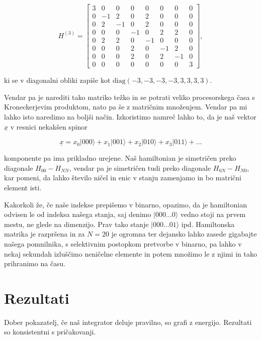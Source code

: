 \documentclass[a4 paper, 12pt]{article}
\begin{document}
\begin{equation}
	H^{(3)} = \begin{bmatrix}
	3 & 0 & 0 & 0 & 0 & 0 & 0 & 0 \\
	0 & -1 & 2 & 0 & 2 & 0 & 0 & 0 \\
	0 & 2 & -1 & 0 & 2 & 0 & 0 & 0 \\
	0 & 0 & 0 & -1 & 0 & 2 & 2 & 0 \\
	0 & 2 & 2 & 0 & -1 & 0 & 0 & 0 \\
	0 & 0 & 0 & 2 & 0 & -1 & 2 & 0 \\
	0 & 0 & 0 & 2 & 0 & 2 & -1 & 0 \\
	0 & 0 & 0 & 0 & 0 & 0 & 0 & 3
	\end{bmatrix},
\end{equation}

ki se v diagonalni obliki zapiše kot $\text{diag}(-3, -3, -3, -3, 3, 3, 3, 3)$.

Vendar pa je narediti tako matriko težko in se potrati veliko procesorskega časa s Kroneckerjevim produktom,
nato pa še z matričnim množenjem. Vendar pa mi lahko isto naredimo na boljši način. Izkoristimo namreč lahko
to, da je naš vektor $\underline{x}$ v resnici nekakšen spinor

\[
	\underline{x} = x_0|000\rangle + x_1|001\rangle + x_2|010\rangle + x_3|011\rangle + \ldots
\]

komponente pa ima prikladno urejene. Naš hamiltonian je simetričen preko diagonale $H_{00} - H_{NN}$,
vendar pa je simetričen tudi preko diagonale $H_{0N} - H_{N0}$, kar pomeni, da lahko število ničel in
enic v stanju zamenjamo in bo matrični element isti.

Kakorkoli že, če naše indekse prepišemo v binarno, opazimo, da je hamiltonian odvisen le od indeksa našega
stanja, saj denimo $|000\ldots0\rangle$ vedno stoji na prvem mestu, ne glede na dimenzijo. Prav tako
stanje $|000\ldots01\rangle$ ipd. Hamiltonska matrika je razpršena in za $N = 20$ je ogromna ter dejansko
lahko zasede gigabajte našega pomnilnika, s selektivnim postopkom pretvorbe v binarno, pa lahko v nekaj
sekundah izluščimo neničelne elemente in potem množimo le z njimi in tako prihranimo na času.

\section{Rezultati}

Dober pokazatelj, če naš integrator deluje pravilno, so grafi z energijo. Rezultati so konsistentni s pričakovanji.
\end{document}
